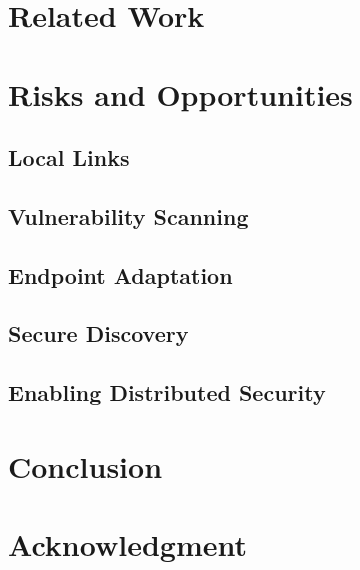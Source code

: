 \documentclass[conference]{IEEEtran}
\begin{document}
\section{Related Work}


\section{Risks and Opportunities}
\label{sec-risks-opportunities}

\subsection{Local Links}


\subsection{Vulnerability Scanning}


\subsection{Endpoint Adaptation}


\subsection{Secure Discovery}


\subsection{Enabling Distributed Security}


\section{Conclusion}


\section*{Acknowledgment}




\end{document}
